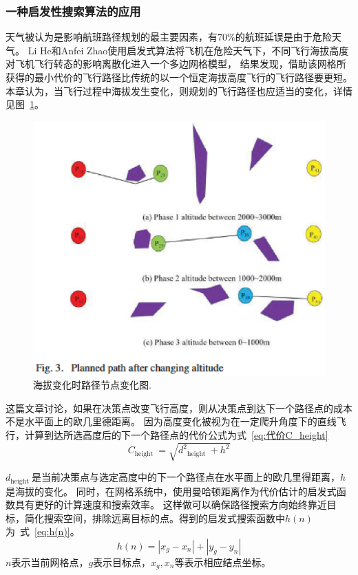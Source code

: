 \documentclass[12pt,a4paper,UTF8]{ctexart}
\begin{document}
\subsubsection{一种启发性搜索算法的应用}
天气被认为是影响航班路径规划的最主要因素，有70\%的航班延误是由于危险天气\cite{Narkawicz2016}。
Li He和Anfei Zhao\cite{hePathPlanningMethod2019}使用启发式算法将飞机在危险天气下，不同飞行海拔高度对飞机飞行转态的影响离散化进入一个多边网格模型，
结果发现，借助该网格所获得的最小代价的飞行路径比传统的以一个恒定海拔高度飞行的飞行路径要更短。
本章认为，当飞行过程中海拔发生变化，则规划的飞行路径也应适当的变化，详情见图~\ref{fig:path plan change }。
\begin{figure}[htbp]
    \centering
    \includegraphics[width=12cm]{allpicture/altitude_change.eps}
    \caption{海拔变化时路径节点变化图.}
    \label{fig:path plan change }
\end{figure}

这篇文章讨论，如果在决策点改变飞行高度，则从决策点到达下一个路径点的成本不是水平面上的欧几里德距离。
因为高度变化被视为在一定爬升角度下的直线飞行，计算到达所选高度后的下一个路径点的代价公式为式~\ref{eq:代价C_height}
\begin{equation}
    C_{\text {height }}=\sqrt{d^2{ }_{\text {height }}+h^2}
    \label{eq:代价C_height}
\end{equation}

$ d_{\text {height }} $是当前决策点与选定高度中的下一个路径点在水平面上的欧几里得距离，$ h $是海拔的变化。
同时，在网格系统中，使用曼哈顿距离作为代价估计的启发式函数具有更好的计算速度和搜索效率\cite{grecheComparisonEuclideanManhattan2017}。
这样做可以确保路径搜索方向始终靠近目标，简化搜索空间，排除远离目标的点。得到的启发式搜索函数中$ h(n) $为~式~\ref{eq:h(n)}。
\begin{equation}
    h(n)=\left|x_g-x_n\right|+\left|y_g-y_n\right|
    \label{eq:h(n)}
\end{equation}
$ n $表示当前网格点，$ g $表示目标点，$ x_g, x_n$等表示相应结点坐标。
\end{document}
